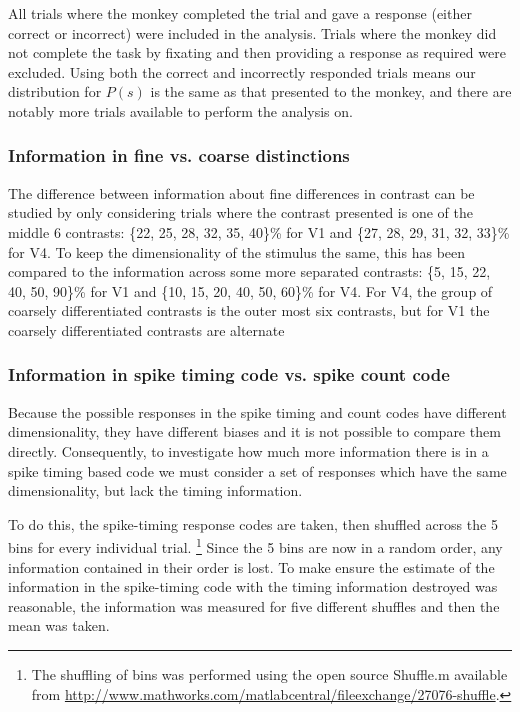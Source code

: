 All trials where the monkey completed the trial and gave a response (either correct or incorrect) were included in the analysis. Trials where the monkey did not complete the task by fixating and then providing a response as required were excluded.
Using both the correct and incorrectly responded trials means our distribution for $P(s)$ is the same as that presented to the monkey, and there are notably more trials available to perform the analysis on.


\FloatBarrier
\subsubsection{Information in fine vs. coarse distinctions}

The difference between information about fine differences in contrast can be studied by only considering trials where the contrast presented is one of the middle 6 contrasts:
\{22, 25, 28, 32, 35, 40\}\% for V1 and
\{27, 28, 29, 31, 32, 33\}\% for V4.
To keep the dimensionality of the stimulus the same, this has been compared to the information across some more separated contrasts:
 \{5, 15, 22, 40, 50, 90\}\% for V1 and
\{10, 15, 20, 40, 50, 60\}\% for V4.
For V4, the group of coarsely differentiated contrasts is the outer most six contrasts, but for V1 the coarsely differentiated contrasts are alternate

\FloatBarrier
\subsubsection{Information in spike timing code vs. spike count code}

Because the possible responses in the spike timing and count codes have different dimensionality, they have different biases \cite{Panzeri2007} and it is not possible to compare them directly.
Consequently, to investigate how much more information there is in a spike timing based code we must consider a set of responses which have the same dimensionality, but lack the timing information.

To do this, the spike-timing response codes are taken, then shuffled across the 5 bins for every individual trial.%
\footnote{The shuffling of bins was performed using the open source Shuffle.m
available from \url{http://www.mathworks.com/matlabcentral/fileexchange/27076-shuffle}.}
Since the 5 bins are now in a random order, any information contained in their order is lost. To make ensure the estimate of the information in the spike-timing code with the timing information destroyed was reasonable, the information was measured for five different shuffles%
 and then the mean was taken.

